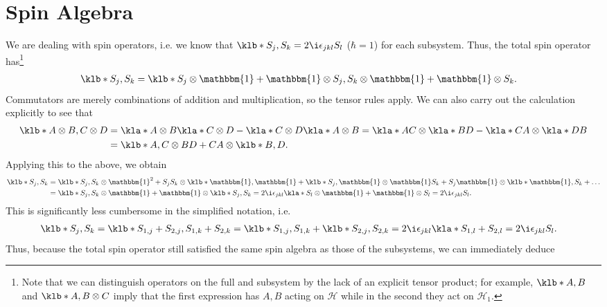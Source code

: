 \documentclass[english, parskip=full]{scrartcl}
\begin{document}
\section{Spin Algebra}
We are dealing with spin operators, i.e. we know that $\klb*{S_j,S_k}=2\i \epsilon_{jkl}S_l$ ($\hbar=1$) for each subsystem.
Thus, the total spin operator has\footnote{Note that we can distinguish operators on the full and subsystem by the lack of an explicit tensor product; for example, $\klb*{A,B}$ and $\klb*{A,B} \otimes C$ imply that the first expression has $A,B$ acting on $\mathcal{H}$ while in the second they act on $\mathcal{H}_1$.}
\begin{align}
\klb*{S_j, S_k} &= \klb*{S_j\otimes \mathbbm{1} + \mathbbm{1}\otimes S_j, S_k\otimes \mathbbm{1} + \mathbbm{1}\otimes S_k}.
\end{align}
Commutators are merely combinations of addition and multiplication, so the tensor rules apply.
We can also carry out the calculation explicitly to see that
\begin{align}
\klb*{A\otimes B, C\otimes D} &= \kla*{A\otimes B} \kla*{C\otimes D} - \kla*{C\otimes D} \kla*{A\otimes B} = \kla*{AC} \otimes \kla*{BD} - \kla*{CA} \otimes \kla*{DB}\\
&= \klb*{A,C} \otimes BD + CA \otimes \klb*{B,D}.
\end{align}
Applying this to the above, we obtain
\begin{align}
\klb*{S_j,S_k} &= \klb*{S_j,S_k} \otimes \mathbbm{1}^2 + S_jS_k \otimes \klb*{\mathbbm{1},\mathbbm{1}} + \klb*{S_j,\mathbbm{1}} \otimes \mathbbm{1} S_k + S_j\mathbbm{1} \otimes \klb*{\mathbbm{1}, S_k} + \dots\\
&= \klb*{S_j,S_k} \otimes \mathbbm{1} + \mathbbm{1}\otimes \klb*{S_j,S_k} = 2\i\epsilon_{jkl} \kla*{S_l\otimes \mathbbm{1} + \mathbbm{1} \otimes S_l} = 2\i\epsilon_{jkl} S_l.
\end{align} %
This is significantly less cumbersome in the simplified notation, i.e.
\begin{align}
\klb*{S_j,S_k} &= \klb*{S_{1,j} + S_{2,j}, S_{1,k} + S_{2,k}} = \klb*{S_{1,j}, S_{1,k}} + \klb*{S_{2,j}, S_{2,k}} = 2\i \epsilon_{jkl} \kla*{S_{1,l} + S_{2,l}} = 2\i \epsilon_{jkl} S_l.
\end{align}
Thus, because the total spin operator still satisfied the same spin algebra as those of the subsystems, we can immediately deduce
\end{document}
